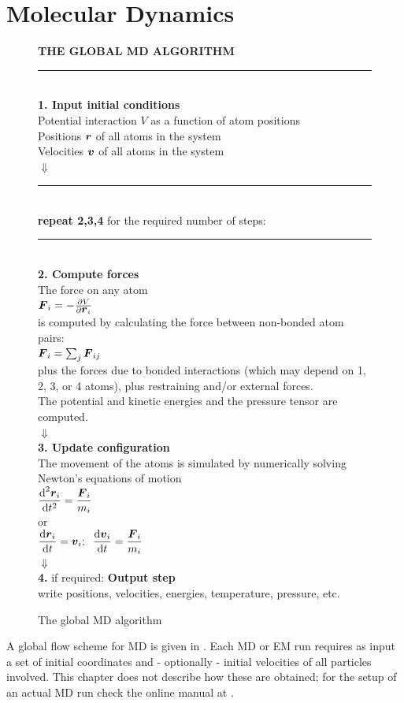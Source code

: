 \section{Molecular Dynamics}
\label{sec:MD}
\begin{figure}
\begin{center}
\addtolength{\fboxsep}{0.5cm}
\begin{shadowenv}[12cm]
{\large \bf THE GLOBAL MD ALGORITHM}
\rule{\textwidth}{2pt} \\
{\bf 1. Input initial conditions}\\[2ex]
Potential interaction $V$ as a function of atom positions\\
Positions $\mbox{\boldmath ${r}$}$ of all atoms in the system\\
Velocities $\mbox{\boldmath ${v}$}$ of all atoms in the system \\
$\Downarrow$\\
\rule{\textwidth}{1pt}\\
{\bf repeat 2,3,4} for the required number of steps:\\
\rule{\textwidth}{1pt}\\
{\bf 2. Compute forces} \\[1ex]
The force on any atom  \\[1ex]
$\mbox{\boldmath ${F}$}_i = - \frac{\partial V}{\partial \mbox{\boldmath ${r}$}_i}$ \\[1ex]
is computed by calculating the force between non-bonded atom pairs: \\
$\mbox{\boldmath ${F}$}_i = \sum_j \mbox{\boldmath ${F}$}_{ij}$ \\
plus the forces due to bonded interactions (which may depend on 1, 2,
3, or 4 atoms), plus restraining and/or external forces. \\
The potential and kinetic energies and the pressure tensor are computed. \\   
$\Downarrow$\\
{\bf 3. Update configuration} \\[1ex]
The movement of the atoms is simulated by numerically solving Newton's
equations of motion \\[1ex]
$\displaystyle
\frac {\mbox{d}^2\mbox{\boldmath ${r}$}_i}{\mbox{d} t^2} = \frac{\mbox{\boldmath ${F}$}_i}{m_i} $ \\
or \\
$\displaystyle
\frac{\mbox{d}\mbox{\boldmath ${r}$}_i}{\mbox{d} t} = \mbox{\boldmath ${v}$}_i ; \;\;
\frac{\mbox{d}\mbox{\boldmath ${v}$}_i}{\mbox{d} t} = \frac{\mbox{\boldmath ${F}$}_i}{m_i} $ \\[1ex]
$\Downarrow$ \\
{\bf 4.} if required: {\bf Output step} \\
write positions, velocities, energies, temperature, pressure, etc. \\
\end{shadowenv}
\caption{The global MD algorithm}
\label{fig:global}
\end{center}
\end{figure}
A global flow scheme for MD is given in . Each
MD or  EM run requires as input a set of initial coordinates and -
optionally - initial velocities of all particles involved. This
chapter does not describe how these are obtained; for the setup of an
actual MD run check the online manual at {\wwwpage}.

